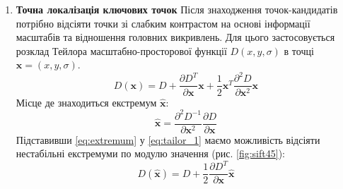 \begin{enumerate}
    \item \textbf{Точна локалізація ключових точок}
          Після знаходження точок-кандидатів потрібно відсіяти точки зі слабким контрастом на основі
          інформації масштабів та відношення головних викривлень. Для цього застосовується розклад
          Тейлора масштабно-просторової функції $D(x,y,\sigma)$ в точці $\textbf{x} = (x,y,\sigma)$.
          \begin{equation}
              D(\textbf{x}) = D + \frac{\partial D^T }{\partial \textbf{x} }\textbf{x} +
              \frac{1}{2}\textbf{x}^T\frac{\partial^2 D}{\partial \textbf{x}^2}\textbf{x}
              \label{eq:tailor_1}
          \end{equation}
          Місце де знаходиться екстремум $\widehat{\textbf{x}}$:
          \begin{equation}
              \widehat{\textbf{x}} = \frac{\partial^2 D^{-1} }{\partial
                  \textbf{x}^2}\frac{\partial D }{\partial \textbf{x}}
              \label{eq:extremum}
          \end{equation}
          Підставивши \ref{eq:extremum} у  \ref{eq:tailor_1} маємо можливість відсіяти нестабільні
          екстремуми по модулю значення (рис. \ref{fig:sift45}):
          \begin{equation}
              D(\widehat{\textbf{x}}) = D + \frac{1}{2}\frac{\partial D^{T} }{\partial \textbf{x}}\widehat{\textbf{x}}
          \end{equation}


\end{enumerate}
